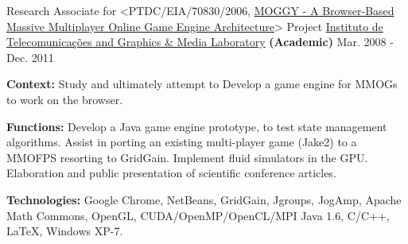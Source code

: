 \begin{cventries}
  \cventry
    {Research Associate for <PTDC/EIA/70830/2006, \href{http://www.di.ubi.pt/~agomes/moggy/index.html}{MOGGY - A Browser-Based Massive Multiplayer Online Game Engine Architecture}> Project} %
    {\href{http://www.it.ubi.pt/medialab}{Instituto de Telecomunica\c{c}\~{o}es and Graphics \& Media Laboratory} \textbf{(Academic)}} %
    {} %
    {Mar. 2008 - Dec. 2011} %
    {
      \begin{cvitems} %
		\item[] {\textbf{Context:} Study and ultimately attempt to Develop a game engine for MMOGs to work on the browser.}
		\item[] {\textbf{Functions:} Develop a Java game engine prototype, to test state management algorithms. Assist in porting an existing multi-player game (Jake2) to a MMOFPS resorting to GridGain. Implement fluid simulators in the GPU. Elaboration and public presentation of scientific conference articles.}
		\item[] {\textbf{Technologies:} %
\textcolor{rainbowcolor-olive}{Google Chrome}, 
\textcolor{rainbowcolor-olive}{NetBeans}, 
\textcolor{rainbowcolor-indigo}{GridGain}, \textcolor{rainbowcolor-indigo}{Jgroups}, \textcolor{rainbowcolor-indigo}{JogAmp}, \textcolor{rainbowcolor-indigo}{Apache Math Commons}, \textcolor{rainbowcolor-indigo}{OpenGL}, \textcolor{rainbowcolor-indigo}{CUDA/OpenMP/OpenCL/MPI}
\textcolor{rainbowcolor-indigo}{Java 1.6}, \textcolor{rainbowcolor-indigo}{C/C++}, \textcolor{rainbowcolor-indigo}{LaTeX}, %
\textcolor{rainbowcolor-orange}{Windows XP-7}.}
      \end{cvitems}
    }     
    

\end{cventries}
